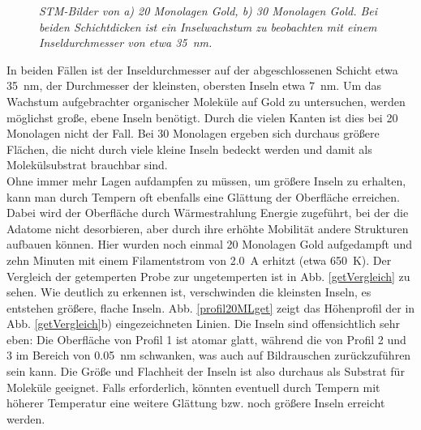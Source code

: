 \begin{figure}[H]
	\begin{minipage}[b]{0.5\textwidth} 
		\sffamily
		
	\end{minipage}
	\hfill
	\begin{minipage}[b]{0.5\textwidth}
		\sffamily
		
	\end{minipage}
	\caption{\textit{STM-Bilder von a) 20 Monolagen Gold, b) 30 Monolagen Gold. Bei beiden
	Schichtdicken ist ein Inselwachstum zu beobachten mit einem Inseldurchmesser von etwa \SI{35}{nm}.}}
	\label{MLVergleich} 
\end{figure}

In beiden Fällen ist der Inseldurchmesser auf der abgeschlossenen Schicht etwa \SI{35}{nm}, der Durchmesser
der kleinsten, obersten Inseln etwa \SI{7}{nm}. Um das Wachstum aufgebrachter organischer Moleküle
auf Gold zu untersuchen, werden möglichst große, ebene Inseln benötigt. Durch die vielen Kanten ist dies bei
20 Monolagen nicht der Fall. Bei 30 Monolagen ergeben sich durchaus größere Flächen, die nicht durch
viele kleine Inseln bedeckt werden und damit als Molekülsubstrat brauchbar sind.\\
Ohne immer mehr Lagen aufdampfen zu müssen, um größere Inseln zu erhalten, kann man durch Tempern
oft ebenfalls eine Glättung der Oberfläche erreichen. Dabei wird der Oberfläche durch Wärmestrahlung 
Energie zugeführt, bei der die Adatome nicht desorbieren, aber durch ihre erhöhte Mobilität
andere Strukturen aufbauen können. Hier wurden noch einmal 20 Monolagen Gold aufgedampft und zehn
Minuten mit einem Filamentstrom von \SI{2,0}{A} erhitzt (etwa \SI{650}{K}). Der Vergleich der
getemperten Probe zur ungetemperten ist in Abb. \ref{getVergleich} zu sehen.
Wie deutlich zu erkennen ist, verschwinden die kleinsten Inseln, es entstehen größere, flache
Inseln. Abb. \ref{profil20MLget} zeigt das Höhenprofil der in Abb. \ref{getVergleich}b)
eingezeichneten Linien. Die Inseln sind offensichtlich sehr eben: Die Oberfläche von Profil 1 ist
atomar glatt, während die von Profil 2 und 3 im Bereich von \SI{0,05}{nm} schwanken, was auch auf
Bildrauschen zurückzuführen sein kann. Die Größe und Flachheit der Inseln ist also durchaus als
Substrat für Moleküle geeignet. Falls erforderlich, könnten eventuell durch Tempern mit höherer
Temperatur eine weitere Glättung bzw. noch größere Inseln erreicht werden. 

